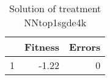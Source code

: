\begin{table}[ht]
\centering
\begin{tabular}{rrr}
  \hline
 & Fitness & Errors \\ 
  \hline
1 & -1.22 &   0 \\ 
   \hline
\end{tabular}
\caption{Solution of treatment NNtop1sgde4k} 
\end{table}
